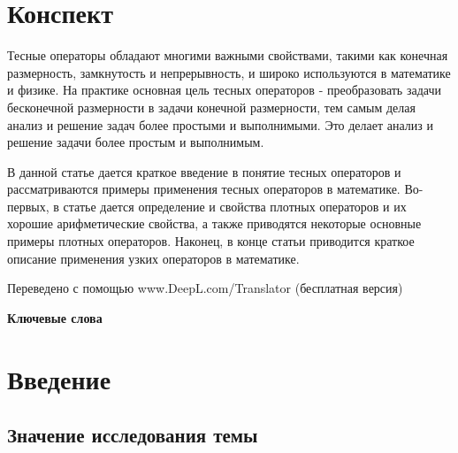\documentclass[openany]{book}
\theoremstyle{definition}
\begin{document}
\pagestyle{empty} %

\frontmatter

\chapter{Конспект}
\renewcommand{\thepage}{\Roman{page}} %
Тесные операторы обладают многими важными свойствами, такими как конечная размерность, замкну\-тость и непрерывность, и широко используются в математике и физике. 
На практике основная цель тесных операторов - преобразовать задачи бесконечной размерности в задачи конечной размерности, тем самым делая анализ и решение задач более простыми и выполнимыми.
Это делает анализ и решение задачи более простым и выполнимым.

В данной статье дается краткое введение в понятие тесных операторов и рассматриваются примеры применения тесных операторов в математике.
Во-первых, в статье дается определение и свойства плотных операторов и их хорошие арифметические свойства, а также приводятся некоторые основные примеры плотных операторов.
Наконец, в конце статьи приводится краткое описание применения узких операторов в математике.

Переведено с помощью www.DeepL.com/Translator (бесплатная версия)



\vspace{1.5cm}
\begin{center}
    {\bfseries Ключевые слова}

\end{center}





\newpage  %
\thispagestyle{empty}


\newpage
\makeatletter
\renewcommand*\l@chapter{\@dottedtocline{0}{0em}{5em}}
\makeatother

\tableofcontents   %

\mainmatter  %
\chapter{Введение}  %
\pagestyle{fancy}
\renewcommand{\thepage}{\arabic{page}} %

\setcounter{page}{1}  %

\section{Значение исследования темы}
\end{document}
